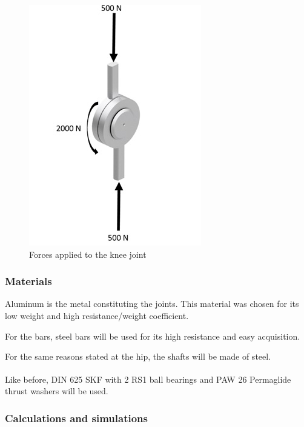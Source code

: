    \begin{figure}[thpb]
      \centering
      \includegraphics[scale=0.5]{Images/joelho_forcas.jpg}
      \caption{Forces applied to the knee joint}
      \label{joelho forcas}
   \end{figure}
   
   \subsubsection{Materials}
   
   Aluminum is the metal constituting the joints. This material was chosen for its low weight and high resistance/weight coefficient.
   
   For the bars, steel bars will be used for its high resistance and easy acquisition.
   
   For the same reasons stated at the hip, the shafts will be made of steel.
   
   Like before, DIN 625 SKF with 2 RS1 ball bearings and PAW 26 Permaglide\textsuperscript{\textregistered} thrust washers will be used.
   
   \subsubsection{Calculations and simulations}
   
